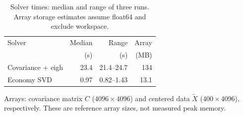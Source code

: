 \begin{table}[!t]
  \caption{Solver times: median and range of three runs.
  Array storage estimates assume float64 and exclude workspace.}
  \label{tab:eff}
  \centering
  \footnotesize
  \setlength{\tabcolsep}{4pt}
  \begin{tabular}{@{}lrrr@{}}
    \toprule
    Solver & Median & Range & Array \\
           & (s) & (s) & (MB) \\
    \midrule
    Covariance + eigh & 23.4 & 21.4--24.7 & 134 \\
    Economy SVD & 0.97 & 0.82--1.43 & 13.1 \\
    \bottomrule
  \end{tabular}
  \vspace{3pt}
  \parbox{\columnwidth}{\scriptsize Arrays: covariance matrix $C$
  ($4096\times4096$) and centered data $\tilde X$ ($400\times4096$),
  respectively. These are reference array sizes, not measured peak memory.}
\end{table}
